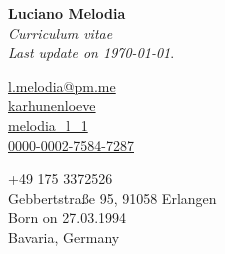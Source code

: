 \documentclass[a4paper,11pt]{article}
\begin{document}
{
  {\Huge \textbf{Luciano Melodia}}\\[0.1cm]
  \emph{Curriculum vitae}\\
  \emph{Last update on \today}.

  \begin{flushleft}
    \scriptsize
      \begin{minipage}{0.3\textwidth}
        {\footnotesize \faEnvelope} \hspace{0.1cm} \href{mailto:l.melodia@pm.me}{l.melodia@pm.me}\\[0.05cm]
        {\footnotesize \faGithub} \hspace{0.15cm} \href{https://karhunenloeve.github.io}{karhunenloeve}\\[0.05cm]
        {\footnotesize \aiarXiv} \hspace{0.1cm} \href{https://arxiv.org/a/melodia_l_1}{melodia\_l\_1}\\[0.05cm]
        {\footnotesize \aiOrcid} \hspace{0.1cm} \href{https://orcid.org/0000-0002-7584-7287}{0000-0002-7584-7287}
      \end{minipage}
      \begin{minipage}{0.4\textwidth}
        {\footnotesize \faPhone} \hspace{0.15cm} +49 175 3372526 \\[0.05cm]
        {\footnotesize \faMapPin} \hspace{0.23cm} Gebbertstraße 95, 91058 Erlangen\\[0.05cm]
        {\footnotesize \faMars} \hspace{0.1cm} Born on 27.03.1994\\[0.05cm]
        {\footnotesize \faMapO} \hspace{0.1cm} Bavaria, Germany
      \end{minipage}
  \end{flushleft}
}


\end{document}
